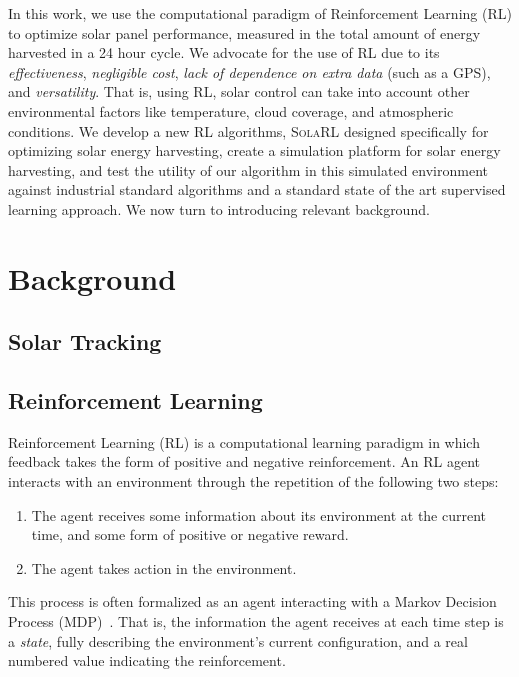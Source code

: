 \documentclass[11pt]{article}
\begin{document}
In this work, we use the computational paradigm of Reinforcement Learning (RL) to optimize solar panel performance, measured in the total amount of energy harvested in a 24 hour cycle. We advocate for the use of RL due to its {\it effectiveness}, {\it negligible cost}, {\it lack of dependence on extra data} (such as a GPS), and {\it versatility}. That is, using RL, solar control can take into account other environmental factors like temperature, cloud coverage, and atmospheric conditions. We develop a new RL algorithms, \textsc{SolaRL} designed specifically for optimizing solar energy harvesting, create a simulation platform for solar energy harvesting, and test the utility of our algorithm in this simulated environment against industrial standard algorithms and a standard state of the art supervised learning approach. We now turn to introducing relevant background.


\section{Background}







\subsection{Solar Tracking}








\subsection{Reinforcement Learning}

Reinforcement Learning (RL) is a computational learning paradigm in which feedback takes the form of positive and negative reinforcement. An RL agent interacts with an environment through the repetition of the following two steps:
\begin{enumerate}
\item The agent receives some information about its environment at the current time, and some form of positive or negative reward.
\item The agent takes action in the environment.
\end{enumerate}
This process is often formalized as an agent interacting with a Markov Decision Process (MDP)~\cite{puterman2014markov}. That is, the information the agent receives at each time step is a {\it state}, fully describing the environment's current configuration, and a real numbered value indicating the reinforcement. \\
\end{document}
